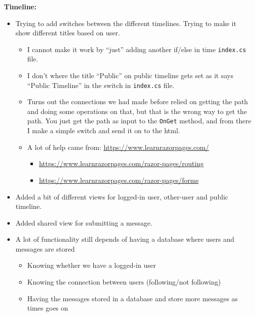\textbf{Timeline:}

\begin{itemize}
    \item Trying to add switches between the different timelines. Trying to make it show different titles based on user.

    \begin{itemize}
        \item I cannot make it work by ``just'' adding another if/else in time \texttt{index.cs} file.
        \item I don't where the title ``Public'' on public timeline gets set as it says ``Public Timeline'' in the switch in \texttt{index.cs} file.
        \item Turns out the connections we had made before relied on getting the path and doing some operations on that, but that is the wrong way to get the path. You just get the path as input to the \texttt{OnGet} method, and from there I make a simple switch and send it on to the html.
        \item A lot of help came from: \url{https://www.learnrazorpages.com/}

        \begin{itemize}
            \item \url{https://www.learnrazorpages.com/razor-pages/routing}
            \item \url{https://www.learnrazorpages.com/razor-pages/forms}
        \end{itemize}
    \end{itemize}

    \item Added a bit of different views for logged-in user, other-user and public timeline.
    \item Added shared view for submitting a message.
    \item A lot of functionality still depends of having a database where users and messages are stored

    \begin{itemize}
        \item Knowing whether we have a logged-in user
        \item Knowing the connection between users (following/not following)
        \item Having the messages stored in a database and store more messages as times goes on
    \end{itemize}
\end{itemize}

